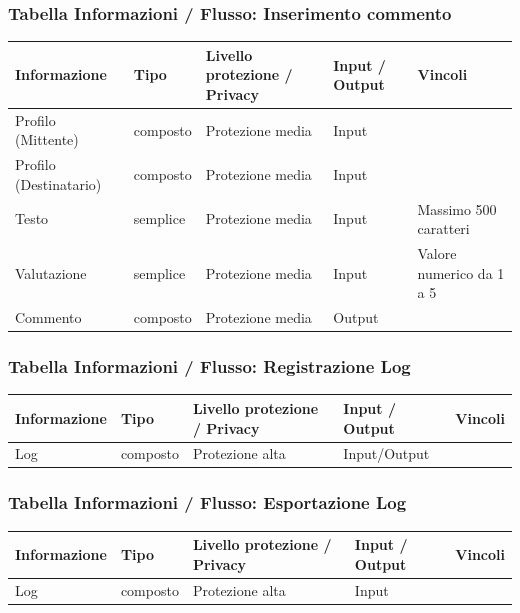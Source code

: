 \documentclass[12pt,a4paper]{report}
\begin{document}
\subsubsection{Tabella Informazioni / Flusso: Inserimento commento}
\begin{tabularx}{\textwidth}{|X|X|X|X|X|}
    \hline
    \rowcolor{studyColor} \textbf{Informazione} & \textbf{Tipo} & \textbf{Livello protezione / Privacy} & \textbf{Input / Output} & \textbf{Vincoli} \\ \hline
    \endhead
    Profilo (Mittente) & composto & Protezione media & Input & \\ \hline
    Profilo (Destinatario) & composto & Protezione media & Input & \\ \hline
    Testo & semplice & Protezione media & Input & Massimo 500 caratteri \\ \hline
    Valutazione & semplice & Protezione media & Input & Valore numerico da 1 a 5 \\ \hline
    Commento & composto & Protezione media & Output & \\ \hline
\end{tabularx}

\subsubsection{Tabella Informazioni / Flusso: Registrazione Log}
\begin{tabularx}{\textwidth}{|X|X|X|X|X|}
    \hline
    \rowcolor{studyColor} \textbf{Informazione} & \textbf{Tipo} & \textbf{Livello protezione / Privacy} & \textbf{Input / Output} & \textbf{Vincoli} \\ \hline
    \endhead
    Log & composto & Protezione alta & Input/Output & \\ \hline
\end{tabularx}

\subsubsection{Tabella Informazioni / Flusso: Esportazione Log}
\begin{tabularx}{\textwidth}{|X|X|X|X|X|}
    \hline
    \rowcolor{studyColor} \textbf{Informazione} & \textbf{Tipo} & \textbf{Livello protezione / Privacy} & \textbf{Input / Output} & \textbf{Vincoli} \\ \hline
    \endhead
    Log & composto & Protezione alta & Input & \\ \hline
\end{tabularx}
\end{document}
